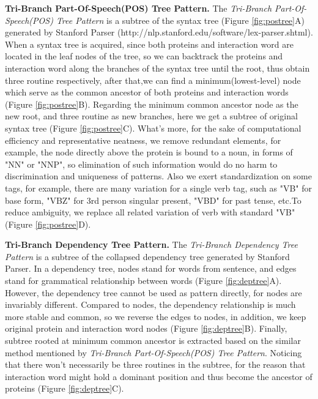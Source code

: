 \textbf{Tri-Branch Part-Of-Speech(POS) Tree Pattern. } The \emph{Tri-Branch Part-Of-Speech(POS) Tree Pattern} is a subtree of the syntax tree (Figure \ref{fig:postree}A) generated by Stanford Parser (http://nlp.stanford.edu/software/lex-parser.shtml). When a syntax tree is acquired, since both proteins and interaction word are located in the leaf nodes of the tree, so we can backtrack the proteins and interaction word along the branches of the syntax tree until the root, thus obtain three routine respectively, after that,we can find a minimum(lowest-level) node which serve as the common ancestor of both proteins and interaction words (Figure \ref{fig:postree}B). Regarding the minimum common ancestor node as the new root, and three routine as new branches, here we get a subtree of original syntax tree (Figure \ref{fig:postree}C). What's more, for the sake of computational efficiency and representative neatness, we remove redundant elements, for example, the node directly above the protein is bound to a noun, in forms of "NN" or "NNP", so elimination of such information would do no harm to discrimination and uniqueness of patterns. Also we exert standardization on some tags, for example, there are many variation for a single verb tag, such as "VB" for base form, "VBZ" for 3rd person singular present, "VBD" for past tense, etc.To reduce ambiguity, we replace all related variation of verb with standard "VB" (Figure \ref{fig:postree}D).

\textbf{Tri-Branch Dependency Tree Pattern. } The \emph{Tri-Branch Dependency Tree Pattern} is a subtree of the collapsed dependency tree generated by Stanford Parser. In a dependency tree, nodes stand for words from sentence, and edges stand for grammatical relationship between words (Figure \ref{fig:deptree}A). However, the dependency tree cannot be used as pattern directly, for nodes are invariably different. Compared to nodes, the dependency relationship is much more stable and common, so we reverse the edges to nodes, in addition, we keep original protein and interaction word nodes (Figure \ref{fig:deptree}B). Finally, subtree rooted at minimum common ancestor is extracted based on the similar method mentioned by \emph{Tri-Branch Part-Of-Speech(POS) Tree Pattern}. Noticing that there won't necessarily be three routines in the subtree, for the reason that interaction word might hold a dominant position and thus become the ancestor of proteins (Figure \ref{fig:deptree}C).


